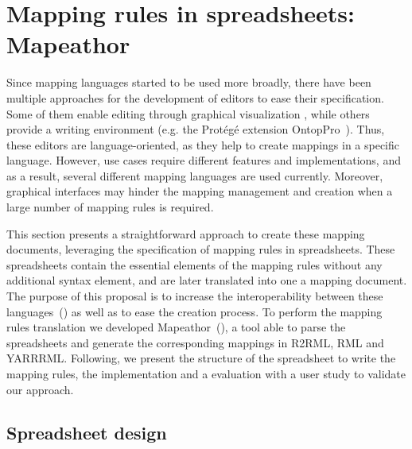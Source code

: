 \section{Mapping rules in spreadsheets: Mapeathor}
\label{sec:chp5_mapeathor}

Since mapping languages started to be used more broadly, there have been multiple approaches for the development of editors to ease their specification. Some of them enable editing through graphical visualization \cite{heyvaert2016rmleditor,sicilia2017map}, while others provide a writing environment (e.g. the Protégé extension OntopPro~). Thus, these editors are language-oriented, as they help to create mappings in a specific language. However, use cases require different features and implementations, and as a result, several different mapping languages are used currently. Moreover, graphical interfaces may hinder the mapping management and creation when a large number of mapping rules is required. 


This section presents a straightforward approach to create these mapping documents, leveraging the  specification of mapping rules in spreadsheets. These spreadsheets contain the essential elements of the mapping rules without any additional syntax element, and are later translated into one a mapping document. The purpose of this proposal is to increase the interoperability between these languages~(\cite{corcho2020towards, iglesias2022devising}) as well as to ease the creation process. To perform the mapping rules translation we developed Mapeathor~(\cite{iglesias-molina_2023_5973906}), a tool able to parse the spreadsheets and generate the corresponding mappings in R2RML, RML and YARRRML. Following, we present the structure of the spreadsheet to write the mapping rules, the implementation and a evaluation with a user study to validate our approach.

\subsection{Spreadsheet design}
\label{sec:chp5_spreadsheet_design}

